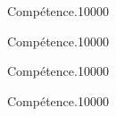 \begin{pageAuto} %

\begin{ExoAutoN}{Compétence.}{1}{0}{0}{0}{0}

\end{ExoAutoN}

\begin{ExoAutoN}{Compétence.}{1}{0}{0}{0}{0}

\end{ExoAutoN}


\begin{ExoAutoN}{Compétence.}{1}{0}{0}{0}{0}

\end{ExoAutoN}


\begin{ExoAutoN}{Compétence.}{1}{0}{0}{0}{0}

\end{ExoAutoN}

\end{pageAuto} %


\begin{pageBrouillon}

\end{pageBrouillon}



